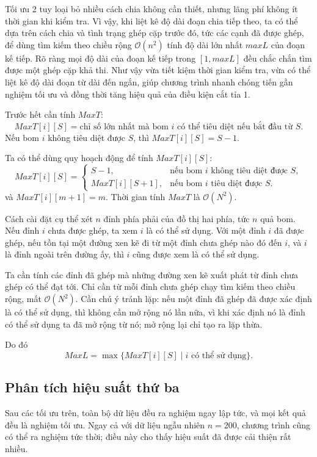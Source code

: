 \documentclass[11pt]{article}
\newcommand{\Oh}{\mathcal{O}}
\begin{document}
Tối ưu 2 tuy loại bỏ nhiều cách chia không cần thiết, nhưng lãng phí không ít
thời gian khi kiểm tra. Vì vậy, khi liệt kê độ dài đoạn chia tiếp theo, ta có
thể dựa trên cách chia và tình trạng ghép cặp trước đó, tức các cạnh đã được
ghép, để dùng tìm kiếm theo chiều rộng $\Oh(n^2)$ tính độ dài lớn nhất
$\mathit{maxL}$ của đoạn kế tiếp. Rõ ràng mọi độ dài của đoạn kế tiếp trong
$[1,\mathit{maxL}]$ đều chắc chắn tìm được một ghép cặp khả thi. Như vậy vừa
tiết kiệm thời gian kiểm tra, vừa có thể liệt kê độ dài đoạn từ dài đến ngắn,
giúp chương trình nhanh chóng tiến gần nghiệm tối ưu và đồng thời tăng hiệu
quả của điều kiện cắt tỉa 1.

Trước hết cần tính $\mathit{MaxT}$:
\[
  \mathit{MaxT}[i][S]=\text{chỉ số lớn nhất mà bom }i\text{ có thể tiêu diệt
  nếu bắt đầu từ }S.
\]
Nếu bom $i$ không tiêu diệt được $S$, thì $\mathit{MaxT}[i][S]=S-1$.

Ta có thể dùng quy hoạch động để tính $\mathit{MaxT}[i][S]$:
\[
  \mathit{MaxT}[i][S]=
  \begin{cases}
    S-1, & \text{nếu bom }i\text{ không tiêu diệt được }S,\\
    \mathit{MaxT}[i][S+1], & \text{nếu bom }i\text{ tiêu diệt được }S.
  \end{cases}
\]
và $\mathit{MaxT}[i][m+1]=m$. Thời gian tính $\mathit{MaxT}$ là $\Oh(N^2)$.

Cách cài đặt cụ thể xét $n$ đỉnh phía phải của đồ thị hai phía, tức $n$ quả
bom. Nếu đỉnh $i$ chưa được ghép, ta xem $i$ là có thể sử dụng. Với một đỉnh
$i$ đã được ghép, nếu tồn tại một đường xen kẽ đi từ một đỉnh chưa ghép nào
đó đến $i$, và $i$ là đỉnh ngoài trên đường ấy, thì $i$ cũng được xem là có
thể sử dụng.

Ta cần tính các đỉnh đã ghép mà những đường xen kẽ xuất phát từ đỉnh chưa ghép
có thể đạt tới. Chỉ cần từ mỗi đỉnh chưa ghép chạy tìm kiếm theo chiều rộng,
mất $\Oh(N^2)$. Cần chú ý tránh lặp: nếu một đỉnh đã ghép đã được xác định là
có thể sử dụng, thì không cần mở rộng nó lần nữa, vì khi xác định nó là đỉnh
có thể sử dụng ta đã mở rộng từ nó; mở rộng lại chỉ tạo ra lặp thừa.

Do đó
\[
  \mathit{MaxL}=\max\{\mathit{MaxT}[i][S]\mid i\text{ có thể sử dụng}\}.
\]

\subsection{Phân tích hiệu suất thứ ba}

Sau các tối ưu trên, toàn bộ dữ liệu đều ra nghiệm ngay lập tức, và mọi kết
quả đều là nghiệm tối ưu. Ngay cả với dữ liệu ngẫu nhiên $n=200$, chương trình
cũng có thể ra nghiệm tức thời; điều này cho thấy hiệu suất đã được cải thiện
rất nhiều.
\end{document}
